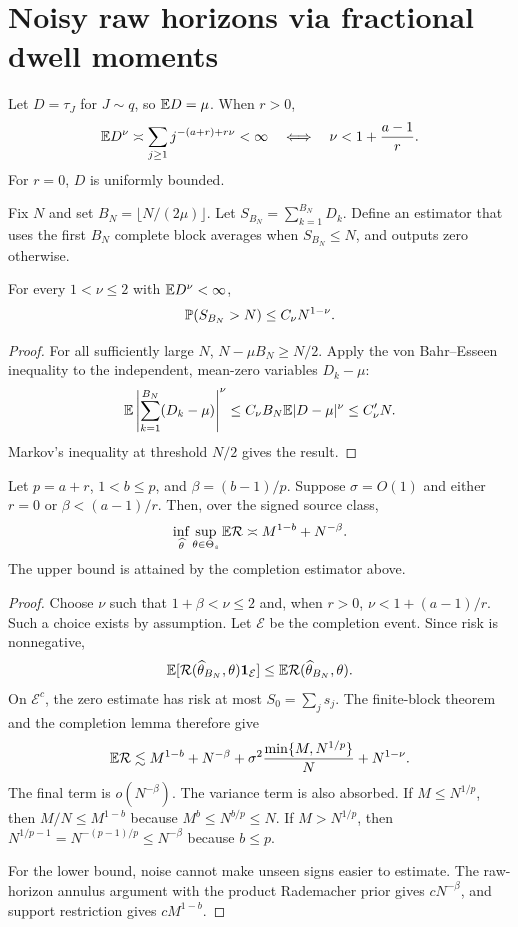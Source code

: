 \section{Noisy raw horizons via fractional dwell moments}

Let $D=\tau_J$ for $J\sim q$, so $\mathbb{E} D=\mu$. When $r>0$,
\[
\mathbb{E} D^\nu\mathrel{\asymp}\sum_{j\ge1}j^{-(a+r)+r\nu}<\infty
\quad\Longleftrightarrow\quad
\nu<1+\frac{a-1}{r}.
\]
For $r=0$, $D$ is uniformly bounded.

Fix $N$ and set $B_N=\lfloor N/(2\mu)\rfloor$. Let
$S_{B_N}=\sum_{k=1}^{B_N}D_k$. Define an estimator that uses the first $B_N$
complete block averages when $S_{B_N}\le N$, and outputs zero otherwise.

\begin{lemma}
For every $1<\nu\le2$ with $\mathbb{E} D^\nu<\infty$,
\[
\mathbb{P}(S_{B_N}>N)\le C_\nu N^{1-\nu}.
\]
\end{lemma}

\begin{proof}
For all sufficiently large $N$, $N-\mu B_N\ge N/2$. Apply the
von Bahr--Esseen inequality \cite{vonbahr1965inequalities} to the independent,
mean-zero variables $D_k-\mu$:
\[
\mathbb{E}\left|\sum_{k=1}^{B_N}(D_k-\mu)\right|^\nu
\le C_\nu B_N\mathbb{E}|D-\mu|^\nu\le C_\nu' N.
\]
Markov's inequality at threshold $N/2$ gives the result.
\end{proof}

\begin{theorem}
Let $p=a+r$, $1<b\le p$, and $\beta=(b-1)/p$. Suppose $\sigma=O(1)$ and either
$r=0$ or $\beta<(a-1)/r$. Then, over the signed source class,
\[
\inf_{\widehat\theta}\sup_{\theta\in\Theta_s}\mathbb{E}\mathcal{R}
\mathrel{\asymp} M^{1-b}+N^{-\beta}.
\]
The upper bound is attained by the completion estimator above.
\end{theorem}

\begin{proof}
Choose $\nu$ such that
$1+\beta<\nu\le2$ and, when $r>0$,
$\nu<1+(a-1)/r$. Such a choice exists by assumption. Let $\mathcal E$ be the
completion event. Since risk is nonnegative,
\[
\mathbb{E}[\mathcal{R}(\widehat\theta_{B_N},\theta)\mathbf{1}_{\mathcal E}]
\le\mathbb{E}\mathcal{R}(\widehat\theta_{B_N},\theta).
\]
On $\mathcal E^c$, the zero estimate has risk at most
$S_0=\sum_js_j$. The finite-block theorem and the completion lemma therefore
give
\[
\mathbb{E}\mathcal{R}\lesssim
M^{1-b}+N^{-\beta}
+\sigma^2\frac{\min\{M,N^{1/p}\}}{N}
+N^{1-\nu}.
\]
The final term is $o(N^{-\beta})$. The variance term is also absorbed. If
$M\le N^{1/p}$, then $M/N\le M^{1-b}$ because $M^b\le N^{b/p}\le N$. If
$M>N^{1/p}$, then
$N^{1/p-1}=N^{-(p-1)/p}\le N^{-\beta}$ because $b\le p$.

For the lower bound, noise cannot make unseen signs easier to estimate. The
raw-horizon annulus argument with the product Rademacher prior gives
$cN^{-\beta}$, and support restriction gives $cM^{1-b}$.
\end{proof}

